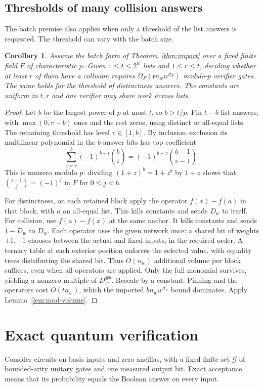 \documentclass[11pt]{article}
\newtheorem{corollary}[theorem]{Corollary}
\theoremstyle{definition}
\theoremstyle{remark}
\begin{document}
\subsection{Thresholds of many collision answers}
The batch premise also applies when only a threshold of the list
answers is requested. The threshold can vary with the batch size.

\begin{corollary}\label{cor:threshold}
Assume the batch form of Theorem~\ref{thm:import} over a fixed finite field
$F$ of characteristic $p$. Given $1\le t\le2^w$ lists and
$1\le r\le t$, deciding whether at least $r$ of them have a collision
requires $\Omega_F(tn_w w^{\sigma_F})$ modulo-$p$ verifier gates.
The same holds for the threshold of distinctness answers. The constants
are uniform in $t,r$ and one verifier may share work across lists.
\end{corollary}
\begin{proof}
Let $b$ be the largest power of $p$ at most $t$, so $b>t/p$.
Pin $t-b$ list answers, with $\max(0,r-b)$ ones and the rest zeros,
using distinct or all-equal lists. The remaining threshold has level
$v\in[1,b]$. By inclusion--exclusion its multilinear polynomial in
the $b$ answer bits has top coefficient
\[
    \sum_{i=v}^b(-1)^{b-i}\binom bi
       =(-1)^{b-v}\binom{b-1}{v-1}.
\]
This is nonzero modulo $p$: dividing $(1+z)^b=1+z^b$ by $1+z$
shows that $\binom{b-1}{j}=(-1)^j$ in $F$ for $0\le j<b$.

For distinctness, on each retained block apply the operator
$f(x)-f(a)$ in that block, with $a$ an all-equal list. This kills
constants and sends $D_w$ to itself. For collision, use $f(a)-f(x)$
at the same anchor. It kills constants and sends $1-D_w$ to $D_w$.
Each operator uses the given network once: a shared bit of weights
$+1,-1$ chooses between the actual and fixed inputs, in the required
order. A ternary table at each exterior position enforces the selected
value, with equality trees distributing the shared bit.
Thus $O(n_w)$ additional volume per block suffices, even when all
operators are applied. Only the full monomial survives, yielding a
nonzero multiple of $D_w^{\otimes b}$. Rescale by a constant. Pinning
and the operators cost $O(tn_w)$, which the imported
$bn_w w^{\sigma_F}$ bound dominates. Apply Lemma~\ref{lem:mod-volume}.
\end{proof}

\section{Exact quantum verification}\label{sec:quantum}
Consider circuits on basis inputs and zero ancillas, with a fixed finite
set $\mathcal G$ of bounded-arity unitary gates and one measured output
bit. Exact acceptance means that its probability equals the Boolean
answer on every input.
\end{document}
